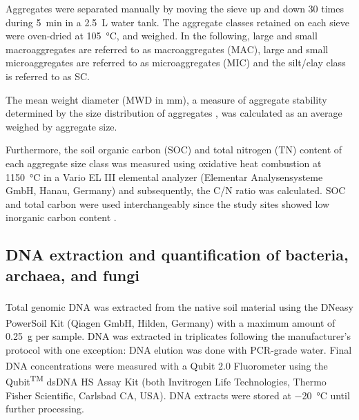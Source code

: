 Aggregates were separated manually by moving the sieve up and down 30 times during \SI{5}{\minute} in a \SI{2.5}{\liter} water tank. The aggregate classes retained on each sieve were oven-dried at \SI{105}{\degreeCelsius}, and weighed. In the following, large and small macroaggregates are referred to as macroaggregates (MAC), large and small microaggregates are referred to as microaggregates (MIC) and the silt/clay class is referred to as SC.

The mean weight diameter (MWD in \si{\milli\metre}), a measure of aggregate stability determined by the size distribution of aggregates \citep{Amezketa1999}, was calculated as an average weighed by aggregate size.

Furthermore, the soil organic carbon (SOC) and total nitrogen (TN) content of each aggregate size class was measured using oxidative heat combustion at \SI{1150}{\degreeCelsius} in a Vario EL III elemental analyzer (Elementar Analysensysteme GmbH, Hanau, Germany) and subsequently, the C/N ratio was calculated. SOC and total carbon were used interchangeably since the study sites showed low inorganic carbon content \citep{RiverasMunoz2022}.

\subsection{DNA extraction and quantification of bacteria, archaea, and fungi}

Total genomic DNA was extracted from the native soil material using the DNeasy\textsuperscript{\textregistered} PowerSoil\textsuperscript{\textregistered} Kit (Qiagen GmbH, Hilden, Germany) with a maximum amount of \SI{0.25}{\gram} per sample. DNA was extracted in triplicates following the manufacturer’s protocol with one exception: DNA elution was done with PCR-grade water. Final DNA concentrations were measured with a Qubit\textsuperscript{\textregistered} 2.0 Fluorometer using the Qubit\textsuperscript{TM} dsDNA HS Assay Kit (both Invitrogen Life Technologies, Thermo Fisher Scientific, Carlsbad CA, USA). DNA extracts were stored at \SI{-20}{\degreeCelsius} until further processing.

